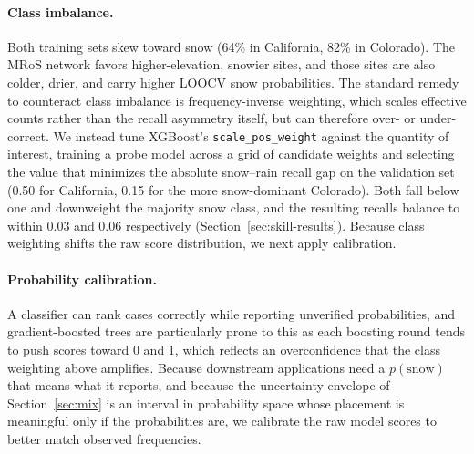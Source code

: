 \documentclass[twocol]{ametsocV6.1} %
\begin{document}
\paragraph{Class imbalance.}
Both training sets skew toward snow (64\% in California, 82\% in
Colorado). The MRoS network favors higher-elevation, snowier sites, and
those sites are also colder, drier, and carry higher LOOCV snow
probabilities. The standard remedy to counteract class imbalance is 
frequency-inverse weighting, which scales effective counts
rather than the recall asymmetry itself, but can therefore over- or
under-correct. We instead tune XGBoost's \texttt{scale\_pos\_weight}
against the quantity of interest, training a probe model across a grid
of candidate weights and selecting the value that minimizes the absolute
snow--rain recall gap on the validation set (0.50 for California, 0.15
for the more snow-dominant Colorado). Both fall below one and downweight the majority snow class,
and the resulting recalls balance to within 0.03 and 0.06 respectively
(Section~\ref{sec:skill-results}). Because class weighting shifts the
raw score distribution, we next apply calibration.

\paragraph{Probability calibration.}
\label{par:calibration}
A classifier can rank cases correctly while reporting unverified probabilities, 
and gradient-boosted trees are particularly prone to this
as each boosting round tends to push scores toward 0 and 1, which reflects an
overconfidence that the class weighting above amplifies. Because 
downstream applications need a $p(\mathrm{snow})$ that means what
it reports, and because the uncertainty envelope of
Section~\ref{sec:mix} is an interval in probability space whose
placement is meaningful only if the probabilities are, we calibrate 
the raw model scores to better match observed frequencies.
\end{document}
